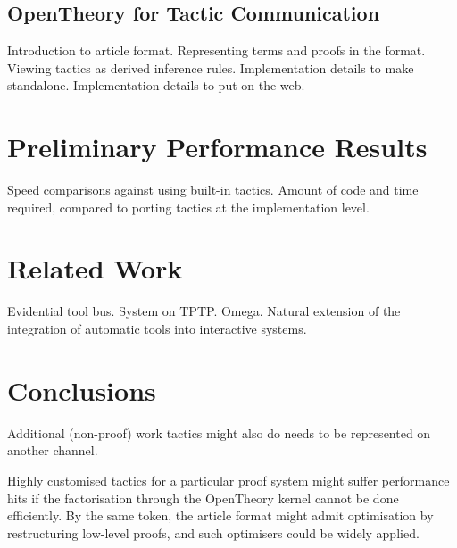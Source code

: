 \documentclass{llncs}
\newcommand{\OpenTheory}{OpenTheory\xspace}
\begin{document}
\subsection{\OpenTheory for Tactic Communication}
\label{sec:opentheory}

Introduction to article format.
Representing terms and proofs in the format.
Viewing tactics as derived inference rules.
Implementation details to make standalone.
Implementation details to put on the web.

\section{Preliminary Performance Results}
\label{sec:performance}

Speed comparisons against using built-in tactics.
Amount of code and time required, compared to porting tactics at the implementation level.

\section{Related Work}

Evidential tool bus.
System on TPTP.
Omega.
Natural extension of the integration of automatic tools into interactive systems.

\section{Conclusions}

Additional (non-proof) work tactics might also do needs to be represented on another channel.

Highly customised tactics for a particular proof system might suffer performance hits if the factorisation through the OpenTheory kernel cannot be done efficiently.
By the same token, the article format might admit optimisation by restructuring low-level proofs, and such optimisers could be widely applied.



\end{document}
